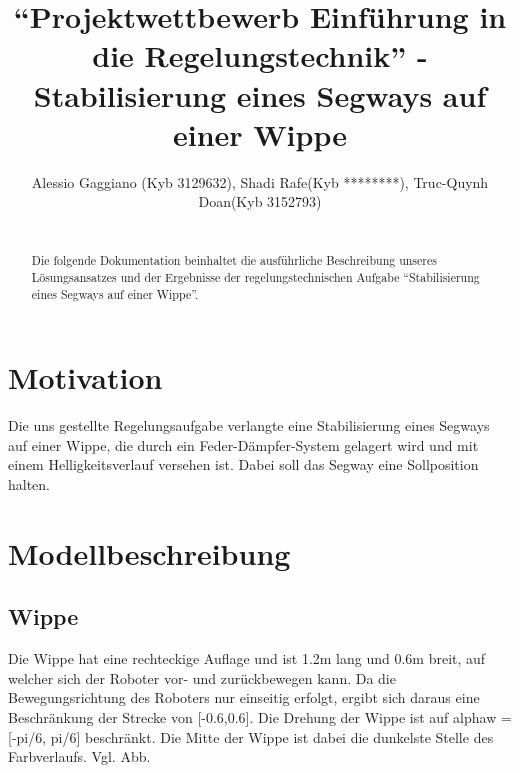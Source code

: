 \documentclass[pdf]{ifacconf}
\begin{document}
\begin{frontmatter}

\title{``Projektwettbewerb Einführung in die Regelungstechnik'' - Stabilisierung eines
Segways auf einer
Wippe}


\author{Alessio Gaggiano (Kyb 3129632), Shadi Rafe(Kyb ********), Truc-Quynh Doan(Kyb 3152793)} 


\begin{abstract}\\                          %
Die folgende Dokumentation beinhaltet die ausführliche Beschreibung unseres Lösungsansatzes und der Ergebnisse der regelungstechnischen Aufgabe ``Stabilisierung eines Segways auf einer Wippe''. 
\end{abstract}

\end{frontmatter}

\section{Motivation}
Die uns gestellte Regelungsaufgabe verlangte eine Stabilisierung eines Segways auf einer Wippe, die durch ein Feder-Dämpfer-System gelagert wird und mit einem Helligkeitsverlauf versehen ist. Dabei soll das Segway eine Sollposition halten. 

\section{Modellbeschreibung}

	\subsection{Wippe}
	Die Wippe hat eine rechteckige Auflage und ist 1.2m lang und 0.6m breit, auf welcher sich der Roboter vor- und zurückbewegen kann.
	Da die Bewegungsrichtung des Roboters nur einseitig erfolgt, ergibt sich daraus eine Beschränkung der Strecke von [-0.6,0.6].
	Die Drehung der Wippe ist auf alphaw = [-pi/6, pi/6] beschränkt.
	Die Mitte der Wippe ist dabei die dunkelste Stelle des Farbverlaufs. Vgl. Abb. 
\end{document}

